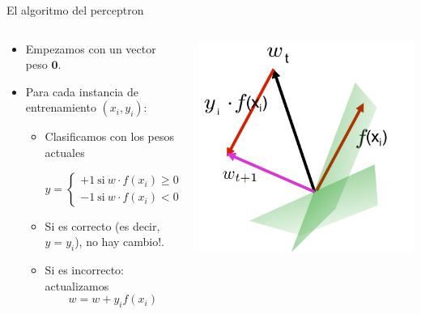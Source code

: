 \documentclass[11pt]{beamer}
\begin{document}
\begin{frame}{El algoritmo del perceptron}
\begin{columns}
	\begin{column}{0.7\textwidth}
\begin{itemize}
\item Empezamos con un vector peso $\mathbf{0}$.
\item Para cada instancia de entrenamiento $(x_i, y_i)$:
\begin{itemize}
	\item Clasificamos con los pesos actuales
	
		\[
		y = \begin{cases}
		+1 \ \text{si}\ w\cdot f(x_i) \geq 0 \\
		-1 \ \text{si}\ w\cdot f(x_i) < 0 
		\end{cases}
		\]
	\item Si es correcto (es decir, $y = y_i$), no hay cambio!.
\item Si es incorrecto: actualizamos
\[
w = w + y_if(x_i)
\]
\end{itemize}
\end{itemize}	
	\end{column}
	\begin{column}{0.3\textwidth}  
		\includegraphics[scale= 0.25]{TA9.png}
	\end{column}
\end{columns}
\end{frame}
\end{document}
